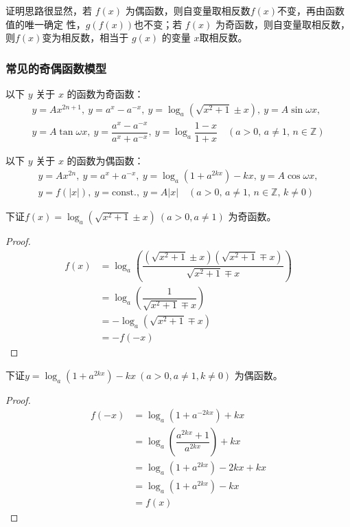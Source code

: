 \documentclass[a4paper,openany]{ctexbook}
\begin{document}
证明思路很显然，若 \(f(x)\) 为偶函数，则自变量取相反数\(f(x)\)不变，再由函数值的唯一确定
性，\(g(f(x))\)也不变；若 \(f(x)\) 为奇函数，则自变量取相反数，则\(f(x)\)变为相反数，相当于 \(g(x)\) 的变量 \(x\)取相反数。

\subsubsection{常见的奇偶函数模型}

以下 \(y\) 关于 \(x\) 的函数为奇函数：
\begin{gather*}
    y=Ax^{2n+1},\ y=a^x-a^{-x},\ y=\log_a\left( \sqrt{x^2+1}\pm x \right),\ y=A\sin \omega x,\\
    y=A \tan \omega x ,\ y=\dfrac{a^x-a^{-x}}{a^x+a^{-x}},\ y=\log_a\dfrac{1-x}{1+x} \quad (a>0,\, a\ne 1,\, n \in \mathbb{Z} )
\end{gather*}

以下 \(y\) 关于 \(x\) 的函数为偶函数：
\begin{align*}
    y=Ax^{2n},\ y=a^x+a^{-x},\ y=\log_a\left( 1+a^{2kx} \right)-kx,\ y=A\cos \omega x, \\
    y=f(|x|),\ y=\mathrm{const.},\ y=A|x| \quad (a>0,\, a\ne 1,\, n \in \mathbb{Z} ,\, k\ne 0)
\end{align*}

下证\(f(x)=\log_a\left( \sqrt{x^2+1}\pm x \right)\ (a>0,a\ne 1)\) 为奇函数。

\begin{proof}
    \begin{align*}
        f(x) & =\log_a\left( \dfrac{\left( \sqrt{x^2+1}\pm x \right)\left( \sqrt{x^2+1}\mp x \right)}{\sqrt{x^2+1}\mp x} \right) \\
             & =\log_a\left( \dfrac{1}{\sqrt{x^2+1}\mp x} \right)                                                                \\
             & =-\log_a \left( \sqrt{x^2+1}\mp x \right)                                                                         \\
             & =-f(-x)
    \end{align*}
\end{proof}

下证\(y=\log_a\left( 1+a^{2kx} \right)-kx\ (a>0,a\ne 1,k\ne 0)\) 为偶函数。

\begin{proof}
    \begin{align*}
        f(-x) & =\log_a\left( 1+a^{-2kx} \right)+kx                 \\
              & =\log_a\left( \dfrac{a^{2kx}+1}{a^{2kx}} \right)+kx \\
              & =\log_a \left( 1+a^{2kx} \right)-2kx+kx             \\
              & =\log_a \left( 1+a^{2kx} \right)-kx                 \\
              & =f(x)
    \end{align*}
\end{proof}
\end{document}
